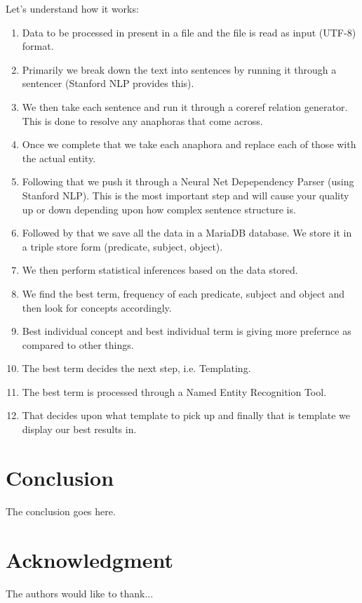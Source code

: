\documentclass[conference]{IEEEtran}
\begin{document}
Let's understand how it works:
\begin{enumerate}
\item Data to be processed in present in a file and the file is read as input (UTF-8) format.
\item Primarily we break down the text into sentences by running it through a sentencer (Stanford NLP provides this).
\item We then take each sentence and run it through a coreref relation generator. This is done to resolve any anaphoras that come across.
\item Once we complete that we take each anaphora and replace each of those with the actual entity.
\item Following that we push it through a Neural Net Depependency Parser (using Stanford NLP). This is the most important step and will cause your quality up or down depending upon how complex sentence structure is.
\item Followed by that we save all the data in a MariaDB database. We store it in a triple store form (predicate, subject, object).
\item We then perform statistical inferences based on the data stored.
\item We find the best term, frequency of each predicate, subject and object and then look for concepts accordingly.
\item Best individual concept and best individual term is giving more prefernce as compared to other things.
\item The best term decides the next step, i.e. Templating.
\item The best term is processed through a Named Entity Recognition Tool.
\item That decides upon what template to pick up and finally that is template we display our best results in.
\end{enumerate}

\section{Conclusion}
The conclusion goes here.
\section*{Acknowledgment}


The authors would like to thank...
\end{document}
